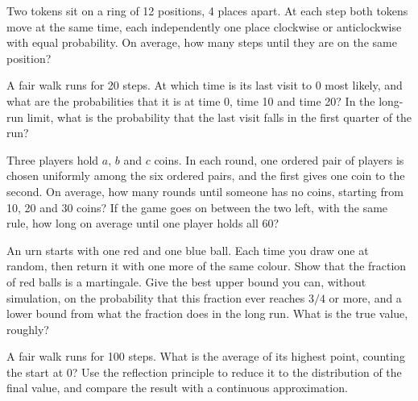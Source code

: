 \begin{question}\label{iq:iv1:random-walks-and-martingales:15}
Two tokens sit on a ring of 12 positions, 4 places apart. At each step both tokens move at the same time, each independently one place clockwise or anticlockwise with equal probability. On average, how many steps until they are on the same position?
\end{question}

\begin{question}\label{iq:iv1:random-walks-and-martingales:16}
A fair walk runs for 20 steps. At which time is its last visit to 0 most likely, and what are the probabilities that it is at time 0, time 10 and time 20? In the long-run limit, what is the probability that the last visit falls in the first quarter of the run?
\end{question}

\begin{question}\label{iq:iv1:random-walks-and-martingales:17}
Three players hold $a$, $b$ and $c$ coins. In each round, one ordered pair of players is chosen uniformly among the six ordered pairs, and the first gives one coin to the second. On average, how many rounds until someone has no coins, starting from 10, 20 and 30 coins? If the game goes on between the two left, with the same rule, how long on average until one player holds all 60?
\end{question}

\begin{question}\label{iq:iv1:random-walks-and-martingales:18}
An urn starts with one red and one blue ball. Each time you draw one at random, then return it with one more of the same colour. Show that the fraction of red balls is a martingale. Give the best upper bound you can, without simulation, on the probability that this fraction ever reaches $3/4$ or more, and a lower bound from what the fraction does in the long run. What is the true value, roughly?
\end{question}

\begin{question}\label{iq:iv1:random-walks-and-martingales:19}
A fair walk runs for 100 steps. What is the average of its highest point, counting the start at 0? Use the reflection principle to reduce it to the distribution of the final value, and compare the result with a continuous approximation.
\end{question}

